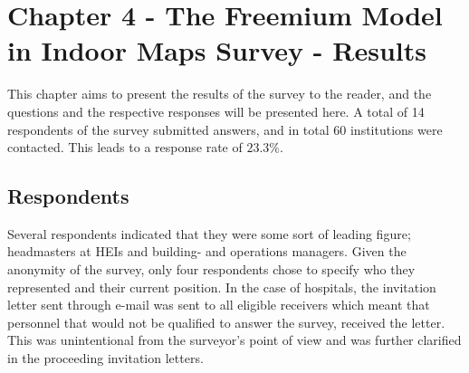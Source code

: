 \chapter{Chapter 4 - The Freemium Model in Indoor Maps Survey - Results}
This chapter aims to present the results of the survey to the reader, and the questions and the respective responses will be presented here.
A total of 14 respondents of the survey submitted answers, and in total 60 institutions were contacted. This leads to a response rate of $23.3\%$. 
\section{Respondents}
Several respondents indicated that they were some sort of leading figure; headmasters at HEIs and building- and operations managers. Given the anonymity of the survey, only four respondents chose to specify who they represented and their current position. In the case of hospitals, the invitation letter sent through e-mail was sent to all eligible receivers which meant that personnel that would not be qualified to answer the survey, received the letter. This was unintentional from the surveyor's point of view and was further clarified in the proceeding invitation letters.

